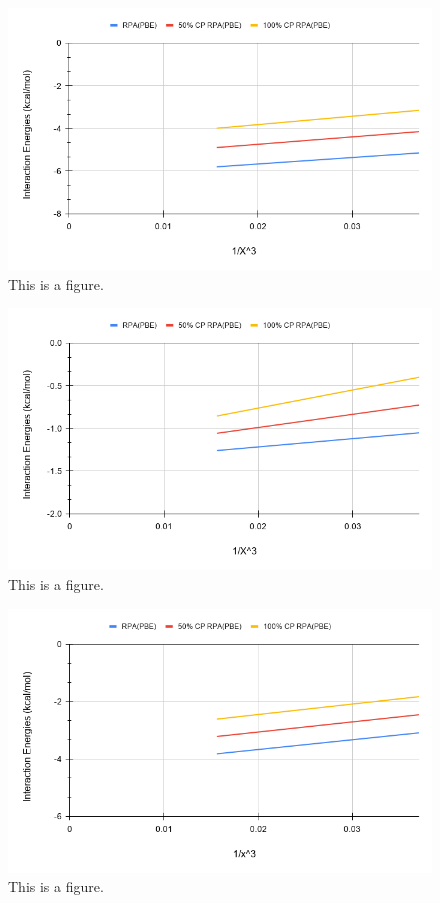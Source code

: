 \documentclass[11pt]{article}
\begin{document}
\begin{figure}
  \includegraphics[scale=0.5]{tpss_24.png}
  \caption{This is a figure.}
  \label{fig:<name>}
\end{figure}

\begin{figure}
  \includegraphics[scale=0.5]{tpss_27.png}
  \caption{This is a figure.}
  \label{fig:<name>}
\end{figure}

\begin{figure}
  \includegraphics[scale=0.5]{tpss_30.png}
  \caption{This is a figure.}
  \label{fig:<name>}
\end{figure}
\end{document}
